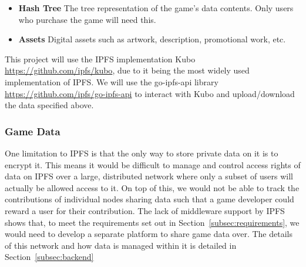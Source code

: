 \begin{itemize}
  \item \textbf{Hash Tree} The tree representation of the game's data contents. Only users who purchase the game will need this.
  \item \textbf{Assets} Digital assets such as artwork, description, promotional work, etc.  
\end{itemize}

\vspace{2mm}\noindent
This project will use the IPFS implementation Kubo \url{https://github.com/ipfs/kubo}, due to it being the most widely used implementation of IPFS. We will use the go-ipfs-api library \url{https://github.com/ipfs/go-ipfs-api} to interact with Kubo and upload/download the data specified above.

\subsubsection*{Game Data}

One limitation to IPFS is that the only way to store private data on it is to encrypt it. This means it would be difficult to manage and control access rights of data on IPFS over a large, distributed network where only a subset of users will actually be allowed access to it. 
On top of this, we would not be able to track the contributions of individual nodes sharing data such that a game developer could reward a user for their contribution. 
\x
The lack of middleware support by IPFS shows that, to meet the requirements set out in Section~\ref{subsec:requirements}, we would need to develop a separate platform to share game data over.
The details of this network and how data is managed within it is detailed in Section~\ref{subsec:backend}
